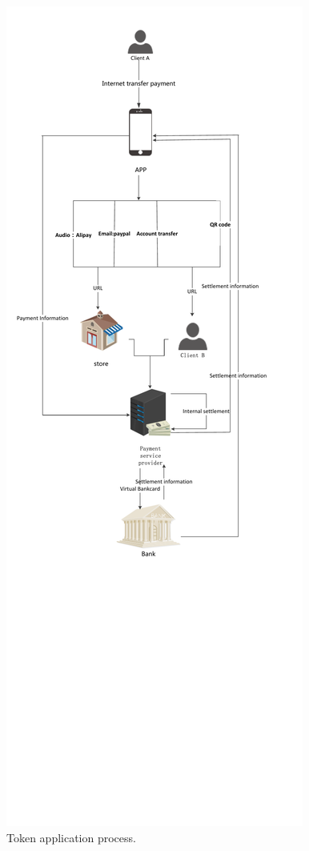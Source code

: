 \documentclass[journal]{IEEEtran}
\begin{document}
\begin{figure}[htbp]
\centerline{\includegraphics[scale=0.58]{zhuanzhangshifu.pdf}}
\caption{Token application process.}
\label{fig}
\end{figure}
\end{document}
